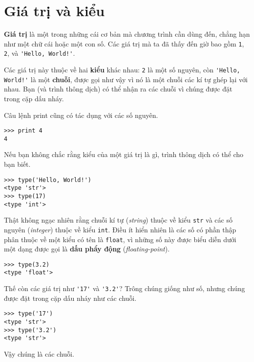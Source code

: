\documentclass[11pt]{book}
\begin{document}
\section{Giá trị và kiểu}

{\bf Giá trị} là một trong những cái cơ bản mà chương trình cần
dùng đến, chẳng hạn như một chữ cái hoặc một con số. Các giá trị
mà ta đã thấy đến giờ bao gồm {\tt 1}, {\tt 2}, và
\verb"'Hello, World!'".

Các giá trị này thuộc về hai {\bf kiểu} khác nhau:
{\tt 2} là một số nguyên, còn \verb"'Hello, World!'" là một 
{\bf chuỗi}, được gọi như vậy vì nó là một chuỗi các kí tự
ghép lại với nhau. Bạn (và trình thông dịch) có thể nhận ra
các chuỗi vì chúng được đặt trong cặp dấu nháy.


Câu lệnh print cũng có tác dụng với các số nguyên.

\beforeverb
\begin{verbatim}
>>> print 4
4
\end{verbatim}
\afterverb
%
Nếu bạn không chắc rằng kiểu của một giá trị là gì, 
trình thông dịch có thể cho bạn biết.

\beforeverb
\begin{verbatim}
>>> type('Hello, World!')
<type 'str'>
>>> type(17)
<type 'int'>
\end{verbatim}
\afterverb
%
Thật không ngạc nhiên rằng chuỗi kí tự ({\em string}) thuộc về kiểu
{\tt str} và các số nguyên ({\em integer}) thuộc về kiểu {\tt int}.
Điều ít hiển nhiên là các số có phần thập phân thuộc về một kiểu có
tên là {\tt float}, vì những số này được biểu diễn dưới một dạng 
được gọi là {\bf dấu phẩy động} ({\em floating-point}).


\beforeverb
\begin{verbatim}
>>> type(3.2)
<type 'float'>
\end{verbatim}
\afterverb
%
Thế còn các giá trị như \verb"'17'" và \verb"'3.2'"?
Trông chúng giống như số, nhưng chúng được đặt trong cặp dấu
nháy như các chuỗi.


\beforeverb
\begin{verbatim}
>>> type('17')
<type 'str'>
>>> type('3.2')
<type 'str'>
\end{verbatim}
\afterverb
%
Vậy chúng là các chuỗi.
\end{document}
